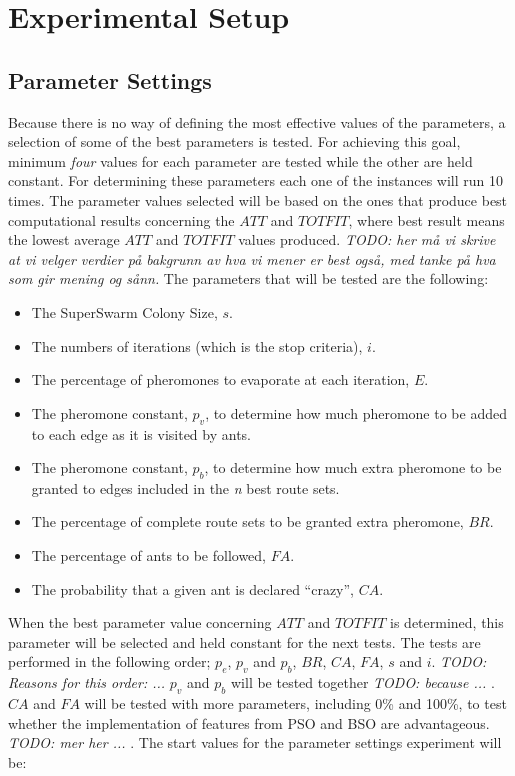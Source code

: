 \section{Experimental Setup}

 
\subsection{Parameter Settings}
\label{subsec:parameterSettings_setup}

Because there is no way of defining the most effective values of the parameters, a selection of some of the best parameters is tested. For achieving this goal, minimum \textit{four} values for each parameter are tested while the other are held constant. For determining these parameters each one of the instances will run 10 times. The parameter values selected will be based on the ones that produce best computational results concerning the $ATT$ and $TOTFIT$, where best result means the lowest average $ATT$ and $TOTFIT$ values produced. \emph{\color{blue} TODO: her må vi skrive at vi velger verdier på bakgrunn av hva vi mener er best også, med tanke på hva som gir mening og sånn. }  The parameters that will be tested are the following:

\begin{itemize}
\item The SuperSwarm Colony Size, $s$. 
\item The numbers of iterations (which is the stop criteria), $i$.
\item The percentage of pheromones to evaporate at each iteration, $E$.
\item The pheromone constant, $p_v$, to determine how much pheromone to be added to each edge as it is visited by ants.
\item The pheromone constant, $p_b$, to determine how much extra pheromone to be granted to edges included in the \textit{n} best route sets.
\item The percentage of complete route sets to be granted extra pheromone, $BR$.
\item The percentage of ants to be followed, $FA$.
\item The probability that a given ant is declared ``crazy'', $CA$.
\end{itemize}

When the best parameter value concerning $ATT$ and $TOTFIT$ is determined, this parameter will be selected and held constant for the next tests. The tests are performed in the following order; $p_{e}$, $p_{v}$ and $p_{b}$, $BR$, $CA$, $FA$, $s$ and $i$. \emph{\color{blue} TODO: Reasons for this order: ... }
$p_{v}$ and $p_{b}$ will be tested together \emph{\color{blue} TODO: because ... }.
$CA$ and $FA$ will be tested with more parameters, including 0\% and 100\%, to test whether the implementation of features from PSO and BSO are advantageous.\emph{\color{blue} TODO: mer her ... }. The start values for the parameter settings experiment will be:



